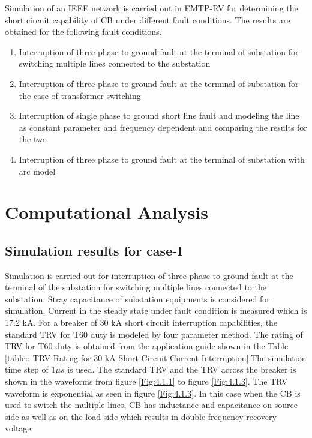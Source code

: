Simulation of an IEEE network is carried out in EMTP-RV for determining the short circuit capability of CB under different fault conditions. The results are obtained for the following fault conditions.
\begin{enumerate}
\item Interruption of three phase to ground fault at the terminal of substation for switching multiple lines connected to the substation

\item Interruption of three phase to ground fault at the terminal of substation for the case of transformer switching

\item Interruption of single phase to ground short line fault and modeling the line as constant parameter and frequency dependent and comparing the results for the two

\item Interruption of three phase to ground fault at the terminal of substation with arc model
\end{enumerate}

\section{Computational Analysis}

\subsection{Simulation results for case-I}
Simulation is carried out for interruption of three phase to ground fault at the terminal of the substation for switching multiple lines connected to the substation. Stray capacitance of substation equipments is considered for simulation. Current in the steady state under fault condition is measured which is 17.2 kA. For a breaker of 30 kA short circuit interruption capabilities, the standard TRV for T60 duty is modeled by four parameter method. The rating of TRV for T60 duty is obtained from the application guide shown in the Table \ref{table:: TRV Rating for 30 kA Short Circuit Current Interruption}.The simulation time step of 1$\mu s$ is used. The standard TRV and the TRV across the breaker is shown in the waveforms from figure \ref{Fig:4.1.1} to figure \ref{Fig:4.1.3}. The TRV waveform is exponential as seen in figure \ref{Fig:4.1.3}. In this case when the CB is used to switch the multiple lines, CB has inductance and capacitance on source side as well as on the load side which results in double frequency recovery voltage.

